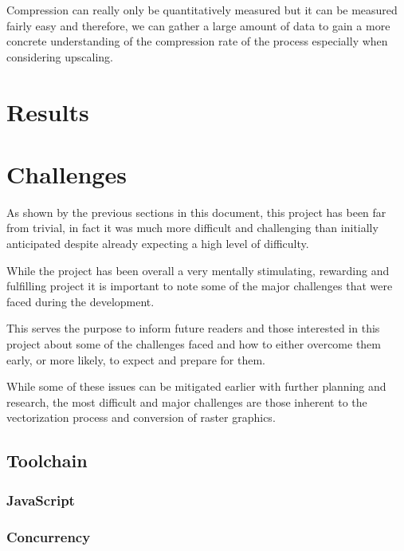\documentclass[12pt]{article}
\newcommand{\sentence}{} %
\begin{document}
    \tab
    Compression can really only be quantitatively measured but it can be measured fairly easy and therefore, we can
    gather a large amount of data to gain a more concrete understanding of the compression rate of the
    process especially when considering upscaling.
    \sentence

    \pagebreak


    \section{Results}\label{sec:results}

    \pagebreak


    \section{Challenges}\label{sec:challenges}

    \tab
    As shown by the previous sections in this document, this project has been far from trivial, in fact it was much
    more difficult and challenging than initially anticipated despite already expecting a high level of difficulty.
    \sentence
    While the project has been overall a very mentally stimulating, rewarding and fulfilling project it is important
    to note some of the major challenges that were faced during the development.
    \sentence
    This serves the purpose to inform future readers and those interested in this project about some of the
    challenges faced and how to either overcome them early, or more likely, to expect and prepare for them.
    \sentence
    While some of these issues can be mitigated earlier with further planning and research, the most difficult and
    major challenges are those inherent to the vectorization process and conversion of raster graphics.

    \subsection{Toolchain}\label{subsec:toolchain2}

    \subsubsection{JavaScript}\label{subsubsec:javascript}

    \subsubsection{Concurrency}\label{subsubsec:concurrency}
\end{document}

